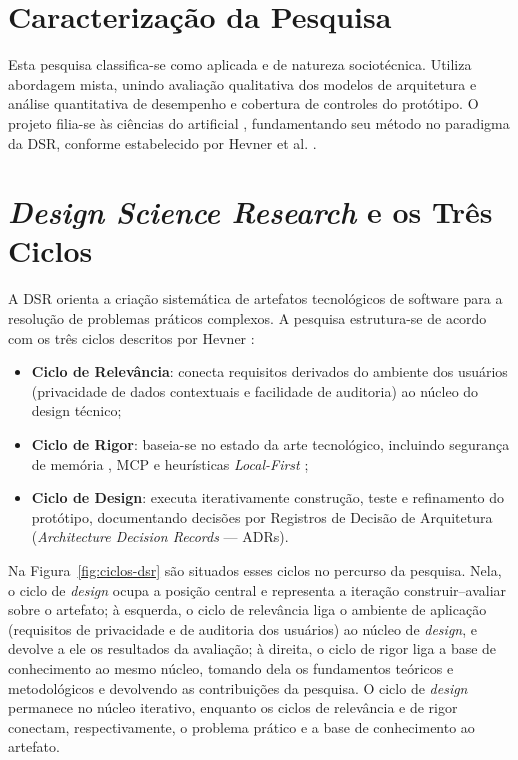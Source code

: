 \documentclass[12pt,openright,twoside,a4paper,english,brazil]{abntex2}
\begin{document}
\section{Caracterização da Pesquisa}
Esta pesquisa classifica-se como aplicada e de natureza sociotécnica. Utiliza abordagem mista, unindo avaliação qualitativa dos modelos de arquitetura e análise quantitativa de desempenho e cobertura de controles do protótipo. O projeto filia-se às ciências do artificial \cite{simon1996}, fundamentando seu método no paradigma da DSR, conforme estabelecido por Hevner et al. \cite{hevner2004}.

\section{\textit{Design Science Research} e os Três Ciclos}
A DSR orienta a criação sistemática de artefatos tecnológicos de software para a resolução de problemas práticos complexos. A pesquisa estrutura-se de acordo com os três ciclos descritos por Hevner \cite{hevner2007}:
\begin{itemize}
\item \textbf{Ciclo de Relevância}: conecta requisitos derivados do ambiente dos usuários (privacidade de dados contextuais e facilidade de auditoria) ao núcleo do design técnico;
\item \textbf{Ciclo de Rigor}: baseia-se no estado da arte tecnológico, incluindo segurança de memória \cite{nsa2022}, MCP \cite{anthropic2024} e heurísticas \textit{Local-First} \cite{kleppmann2019};
\item \textbf{Ciclo de Design}: executa iterativamente construção, teste e refinamento do protótipo, documentando decisões por Registros de Decisão de Arquitetura (\textit{Architecture Decision Records} --- ADRs).
\end{itemize}
Na Figura~\ref{fig:ciclos-dsr} são situados esses ciclos no percurso da pesquisa. Nela, o ciclo de \textit{design} ocupa a posição central e representa a iteração construir--avaliar sobre o artefato; à esquerda, o ciclo de relevância liga o ambiente de aplicação (requisitos de privacidade e de auditoria dos usuários) ao núcleo de \textit{design}, e devolve a ele os resultados da avaliação; à direita, o ciclo de rigor liga a base de conhecimento ao mesmo núcleo, tomando dela os fundamentos teóricos e metodológicos e devolvendo as contribuições da pesquisa. O ciclo de \textit{design} permanece no núcleo iterativo, enquanto os ciclos de relevância e de rigor conectam, respectivamente, o problema prático e a base de conhecimento ao artefato.
\end{document}

